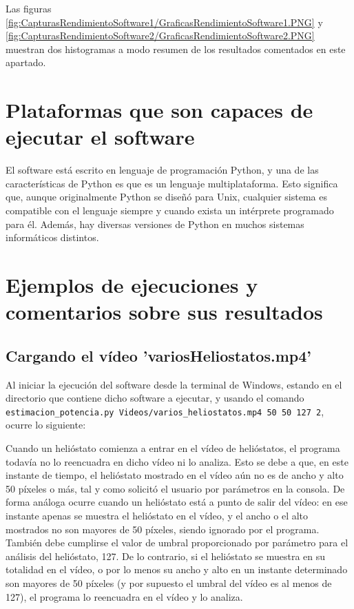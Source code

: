 Las figuras \ref{fig:CapturasRendimientoSoftware1/GraficasRendimientoSoftware1.PNG} y \ref{fig:CapturasRendimientoSoftware2/GraficasRendimientoSoftware2.PNG} muestran dos histogramas a modo resumen de los resultados comentados en este apartado.

\section{Plataformas que son capaces de ejecutar el software}

El software está escrito en lenguaje de programación Python, y una de las características de Python es que es un lenguaje multiplataforma. Esto significa que, aunque originalmente Python se diseñó para Unix, cualquier sistema es compatible con el lenguaje siempre y cuando exista un intérprete programado para él. Además, hay diversas versiones de Python en muchos sistemas informáticos distintos.

\section{Ejemplos de ejecuciones y comentarios sobre sus resultados}

\subsection{Cargando el vídeo 'variosHeliostatos.mp4'}

Al iniciar la ejecución del software desde la terminal de Windows, estando en el directorio que contiene dicho software a ejecutar, y usando el comando\\ \verb|estimacion_potencia.py Videos/varios_heliostatos.mp4 50 50 127 2|, ocurre lo siguiente:

Cuando un helióstato comienza a entrar en el vídeo de helióstatos, el programa todavía no lo reencuadra en dicho vídeo ni lo analiza. Esto se debe a que, en este instante de tiempo, el helióstato mostrado en el vídeo aún no es de ancho y alto 50 píxeles o más, tal y como solicitó el usuario por parámetros en la consola. De forma análoga ocurre cuando un helióstato está a punto de salir del vídeo: en ese instante apenas se muestra el helióstato en el vídeo, y el ancho o el alto mostrados no son mayores de 50 píxeles, siendo ignorado por el programa. También debe cumplirse el valor de umbral proporcionado por parámetro para el análisis del helióstato, 127. De lo contrario, si el helióstato se muestra en su totalidad en el vídeo, o por lo menos su ancho y alto en un instante determinado son mayores de 50 píxeles (y por supuesto el umbral del vídeo es al menos de 127), el programa lo reencuadra en el vídeo y lo analiza.

